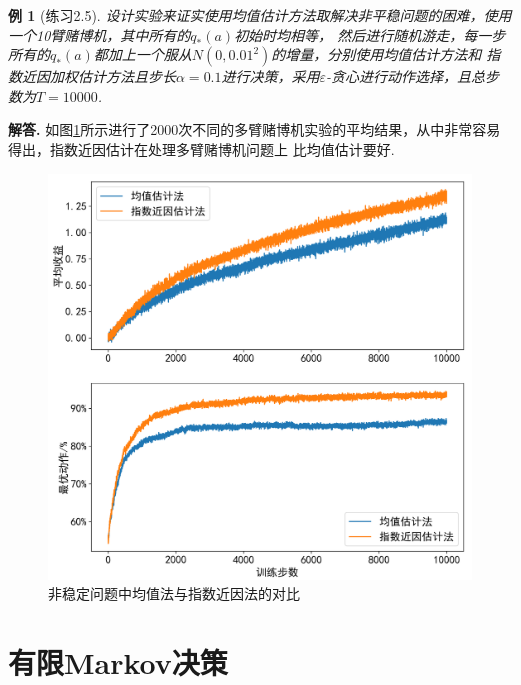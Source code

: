 \documentclass[12pt, a4paper, oneside]{ctexart}
\newtheorem{example}{例}            %
\numberwithin{equation}{section}  %
\newenvironment{solution}[1][]{\par\noindent\textbf{#1解答. }}{\smallskip\par}  %
\begin{document}
\begin{example}[练习2.5]
    设计实验来证实使用均值估计方法取解决非平稳问题的困难，使用一个10臂赌博机，其中所有的$q_*(a)$初始时均相等，
    然后进行随机游走，每一步所有的$q_*(a)$都加上一个服从$N(0,0.01^2)$的增量，分别使用均值估计方法和
    指数近因加权估计方法且步长$\alpha=0.1$进行决策，采用$\varepsilon$-贪心进行动作选择，且总步数为$T=10000$.
\end{example}
\begin{solution}
    如图\ref{fig-averge_recency}所示进行了2000次不同的多臂赌博机实验的平均结果，从中非常容易得出，指数近因估计在处理多臂赌博机问题上
    比均值估计要好.
\end{solution}
\begin{figure}[htbp]
    \centering
    \includegraphics[scale=0.13]{../figures/033/033页练习2.5.png}
    \caption{非稳定问题中均值法与指数近因法的对比}
    \label{fig-averge_recency}
\end{figure}
\section{有限Markov决策}
\end{document}
